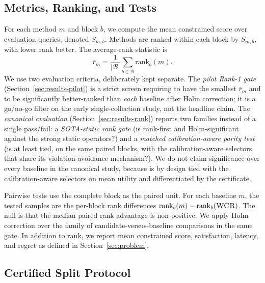 \subsection{Metrics, Ranking, and Tests}

For each method $m$ and block $b$, we compute the mean constrained score over evaluation queries, denoted $S_{m,b}$. Methods are ranked within each block by $S_{m,b}$, with lower rank better. The average-rank statistic is
\begin{equation}
  \bar{r}_m=\frac{1}{|\mathcal{B}|}\sum_{b\in\mathcal{B}}\mathrm{rank}_b(m).
\end{equation}
We use two evaluation criteria, deliberately kept separate. The \emph{pilot Rank-1 gate} (Section~\ref{sec:results-pilot}) is a strict screen requiring \WCR{} to have the smallest $\bar{r}_m$ and to be significantly better-ranked than \emph{each} baseline after Holm correction; it is a go/no-go filter on the early single-collection study, not the headline claim. The \emph{canonical evaluation} (Section~\ref{sec:results-rank}) reports two families instead of a single pass/fail: a \emph{SOTA-static rank gate} (is \CWC{} rank-first and Holm-significant against the strong static operators?) and a \emph{matched calibration-aware parity test} (is \CWC{} at least tied, on the same paired blocks, with the calibration-aware selectors that share its violation-avoidance mechanism?). We do not claim significance over every baseline in the canonical study, because \CWC{} is by design tied with the calibration-aware selectors on mean utility and differentiated by the certificate.

Pairwise tests use the complete block as the paired unit. For each baseline $m$, the tested samples are the per-block rank differences $\mathrm{rank}_b(m)-\mathrm{rank}_b(\textsc{WCR}{})$. The null is that the median paired rank advantage is non-positive. We apply Holm correction over the family of candidate-versus-baseline comparisons in the same gate. In addition to rank, we report mean constrained score, satisfaction, latency, and regret as defined in Section~\ref{sec:problem}.

\subsection{Certified Split Protocol}
\label{subsec:split}


